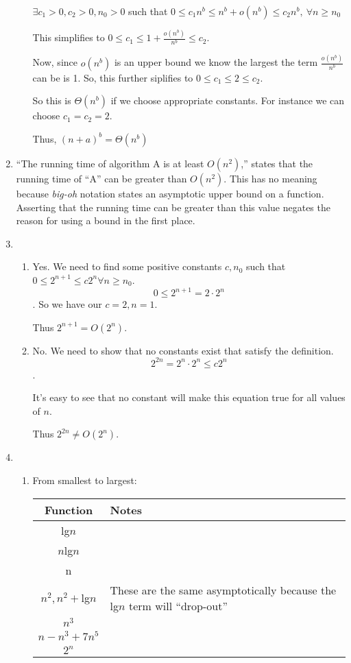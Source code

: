 \documentclass[12pt,letterpaper]{article}
\begin{document}
\begin{enumerate}
\begin{enumerate}
          $\exists c_1 > 0, c_2 > 0, n_0 > 0$ such that $0 \le c_1n^b \le n^b + o(n^b) \le c_2n^b, \ \forall n \ge n_0$

          This simplifies to $0 \le c_1 \le 1 + \frac{o(n^b)}{n^b} \le c_2$.

          Now, since $o(n^b)$ is an upper bound we know the largest the term $\frac{o(n^b)}{n^b}$ can be is 1.
          So, this further siplifies to $0 \le c_1 \le 2 \le c_2$.

          So this is $\Theta(n^b)$ if we choose appropriate constants.
          For instance we can choose $c_1 = c_2 = 2$.

          Thus, $(n + a)^b = \Theta(n^b)$
      \end{enumerate}

    \item
      ``The running time of algorithm A is at least $O(n^2)$,'' states that the running time of ``A'' can be greater than $O(n^2)$.
      This has no meaning because \textit{big-oh} notation states an asymptotic upper bound on a function.
      Asserting that the running time can be greater than this value negates the reason for using a bound in the first place.

    \item
      \begin{enumerate}
        \item Yes.
          We need to find some positive constants $c, n_0$ such that $0 \le 2^{n+1} \le c2^n \forall n \ge n_0$.
          \[0 \le 2^{n + 1} = 2 \cdot 2^n\]. So we have our $c = 2, n = 1$.

          Thus $2^{n+1} = O(2^n)$.

        \item No.
          We need to show that no constants exist that satisfy the definition.
          \[2^{2n} = 2^n \cdot 2^n \le c2^n\].

          It's easy to see that no constant will make this equation true for all values of $n$.

          Thus $2^{2n} \ne O(2^n)$.
      \end{enumerate}

    \item
      \begin{enumerate}
        \item
          From smallest to largest:

          \begin{tabular}{c | l}
            Function & Notes \\
            \hline
            lg$n$ \\
            $n$lg$n$ \\
            n \\
            $n^2, n^2 + $lg$n$ & These are the same asymptotically because the lg$n$ term will ``drop-out'' \\
            $n^3$ \\
            $n - n^3 + 7n^5$ \\
            $2^n$
          \end{tabular}


\end{enumerate}
\end{enumerate}
\end{document}
